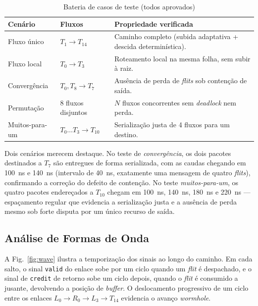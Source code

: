\documentclass[conference]{IEEEtran}
\begin{document}
\begin{table}[!t]
\caption{Bateria de casos de teste (todos aprovados)}
\label{tab:testes}
\centering
\renewcommand{\arraystretch}{1.25}
\footnotesize
\begin{tabular}{@{}p{1.7cm}p{2.2cm}p{3.0cm}@{}}
\toprule
\textbf{Cenário} & \textbf{Fluxos} & \textbf{Propriedade verificada} \\
\midrule
Fluxo único    & $T_1\!\to\!T_{14}$        & Caminho completo (subida adaptativa + descida determinística). \\
Fluxo local    & $T_0\!\to\!T_3$           & Roteamento local na mesma folha, sem subir à raiz. \\
Convergência   & $T_0,T_8\!\to\!T_7$       & Ausência de perda de \emph{flits} sob contenção de saída. \\
Permutação     & 8 fluxos disjuntos        & $N$ fluxos concorrentes sem \emph{deadlock} nem perda. \\
Muitos-para-um & $T_0\ldots T_3\!\to\!T_{10}$ & Serialização justa de 4 fluxos para um destino. \\
\bottomrule
\end{tabular}
\end{table}

Dois cenários merecem destaque. No teste de \emph{convergência}, os dois pacotes
destinados a $T_{7}$ são entregues de forma serializada, com as caudas chegando
em \SI{100}{ns} e \SI{140}{ns} (intervalo de \SI{40}{ns}, exatamente uma
mensagem de quatro \emph{flits}), confirmando a correção do defeito de contenção.
No teste \emph{muitos-para-um}, os quatro pacotes endereçados a $T_{10}$ chegam
em \SI{100}{ns}, \SI{140}{ns}, \SI{180}{ns} e \SI{220}{ns} --- espaçamento regular que
evidencia a serialização justa e a ausência de perda mesmo sob forte disputa por
um único recurso de saída.

\subsection{Análise de Formas de Onda}
A Fig.~\ref{fig:wave} ilustra a temporização dos sinais ao longo do caminho. Em
cada salto, o sinal \texttt{valid} do enlace sobe por um ciclo quando um
\emph{flit} é despachado, e o sinal de \texttt{credit} de retorno sobe um ciclo
depois, quando o \emph{flit} é consumido a jusante, devolvendo a posição de
\emph{buffer}. O deslocamento progressivo de um ciclo entre os enlaces
$L_0\!\to\!R_0\!\to\!L_3\!\to\!T_{14}$ evidencia o avanço \emph{wormhole}.
\end{document}
